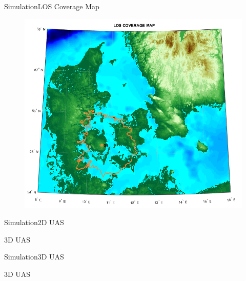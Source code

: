 \begin{frame}{Simulation}{LOS Coverage Map} 
  	\begin{figure}
        \includegraphics[scale=0.40]{../report/figures/los_odense.png}
    \end{figure}
\end{frame}



\begin{frame}{Simulation}{2D UAS}

  \begin{block}{3D UAS}

  \end{block}

\end{frame}

\begin{frame}{Simulation}{3D UAS}

  \begin{block}{3D UAS}

  \end{block}

\end{frame}